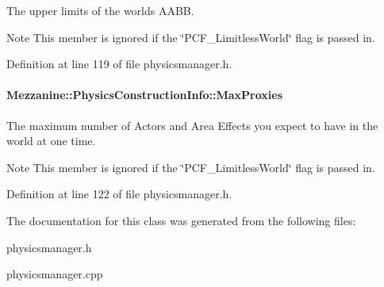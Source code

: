 The upper limits of the worlds AABB. 

\begin{DoxyNote}{Note}
This member is ignored if the \char`\"{}PCF\_\-LimitlessWorld\char`\"{} flag is passed in. 
\end{DoxyNote}


Definition at line 119 of file physicsmanager.h.

\hypertarget{classMezzanine_1_1PhysicsConstructionInfo_a33cf4caa561d10c3d1df0ea150612c95}{
\paragraph[{MaxProxies}]{ {\bf Mezzanine::PhysicsConstructionInfo::MaxProxies}}\hfill}
\label{classMezzanine_1_1PhysicsConstructionInfo_a33cf4caa561d10c3d1df0ea150612c95}


The maximum number of Actors and Area Effects you expect to have in the world at one time. 

\begin{DoxyNote}{Note}
This member is ignored if the \char`\"{}PCF\_\-LimitlessWorld\char`\"{} flag is passed in. 
\end{DoxyNote}


Definition at line 122 of file physicsmanager.h.



The documentation for this class was generated from the following files:\begin{DoxyCompactItemize}
\item 
physicsmanager.h\item 
physicsmanager.cpp\end{DoxyCompactItemize}
